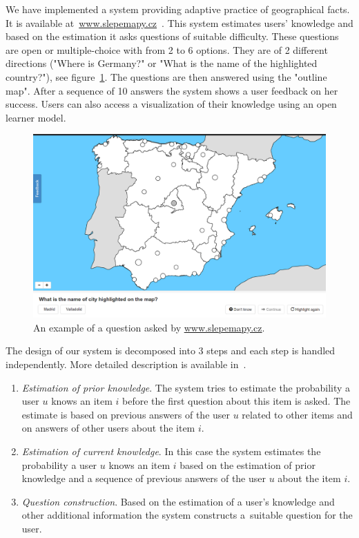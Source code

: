 \documentclass[table,color,cover,twoside,nolot,nolof]{fithesis3/fithesis3}
\begin{document}
We have implemented a system providing adaptive practice of geographical
facts. It is available at~\url{www.slepemapy.cz}~\cite{papousek2014adaptive}. This system
estimates users' knowledge and based on the estimation it asks questions of
suitable difficulty. These questions are open or multiple-choice with from 2 to
6 options. They are of 2 different directions ("Where is Germany?" or "What is
the name of the highlighted country?"), see
figure~\ref{figure:example_question}. The questions are then answered using the
"outline map". After a sequence of 10 answers the system shows a user feedback
on her success. Users can also access a visualization of their knowledge using
an open learner model.

\begin{figure}[h]
	\begin{center}
		\includegraphics[width=\textwidth]{figure/slepemapy_spain_highlighted}
		\caption{An example of a question asked by \url{www.slepemapy.cz}.}
		\label{figure:example_question}
	\end{center}
\end{figure}

The design of our system is decomposed into 3 steps and each step is handled
independently. More detailed description is available
in~\cite{papousek2014adaptive, papousek2015impact}.

\begin{enumerate}
	\item \emph{Estimation of prior knowledge}. The system tries to estimate the
		probability a user $u$ knows an item $i$ before the first question
		about this item is asked. The estimate is based on previous answers of the
		user $u$ related to other items and on answers of other users about the
		item $i$.
	\item \emph{Estimation of current knowledge}. In this case the system
		estimates the probability a user $u$ knows an item $i$ based on the
		estimation of prior knowledge and a sequence of previous answers of the
		user $u$ about the item $i$.
	\item \emph{Question construction}. Based on the estimation of a user's
		knowledge and other additional information the system constructs a~suitable
		question for the user.
\end{enumerate}
\end{document}
